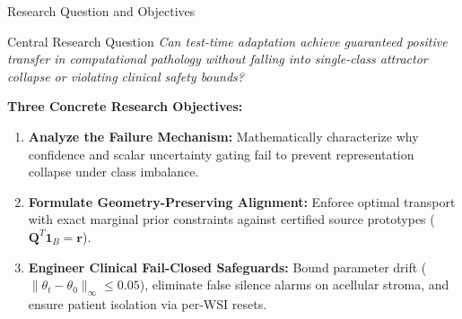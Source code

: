 \documentclass[aspectratio=169,10pt]{beamer}
\begin{document}
\begin{frame}{Research Question and Objectives}
    \begin{block}{Central Research Question}
        \centering\large
        \textit{Can test-time adaptation achieve guaranteed positive transfer in computational pathology without falling into single-class attractor collapse or violating clinical safety bounds?}
    \end{block}

    \vspace{0.3cm}
    \textbf{Three Concrete Research Objectives:}
    \begin{enumerate}
        \item \textbf{Analyze the Failure Mechanism:} Mathematically characterize why confidence and scalar uncertainty gating fail to prevent representation collapse under class imbalance.
        \item \textbf{Formulate Geometry-Preserving Alignment:} Enforce optimal transport with exact marginal prior constraints against certified source prototypes ($\mathbf{Q}^T \mathbf{1}_B = \mathbf{r}$).
        \item \textbf{Engineer Clinical Fail-Closed Safeguards:} Bound parameter drift ($\|\theta_t - \theta_0\|_\infty \le 0.05$), eliminate false silence alarms on acellular stroma, and ensure patient isolation via per-WSI resets.
    \end{enumerate}
\end{frame}
\end{document}
